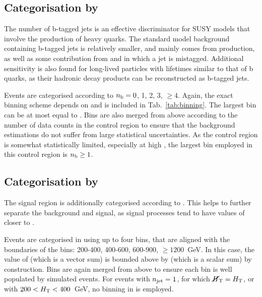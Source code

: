 \subsection*{Categorisation by \nb}

The number of b-tagged jets is an effective discriminator for SUSY %
models that involve the production of heavy quarks. The standard model 
background containing b-tagged jets is relatively smaller, and mainly comes 
from \ttbar production, as well as some contribution from \wj and \zj in which 
a jet is mistagged. Additional sensitivity is also found for long-lived 
particles with lifetimes similar to that of b quarks, as their hadronic decay 
products can be reconstructed as b-tagged jets.

Events are categorised according to $n_{\text{b}} = 0$, 1, 2, 3, $\geq4$.
Again, the exact binning scheme depends on \njet and is included in 
Tab.~\ref{tab:binning}.
The largest \nb bin can be at most equal to \njet. Bins are also merged from 
above according to the number of data counts in the \mj control region to 
ensure that the background estimations do not suffer from large statistical 
uncertainties.
As the \mmj control region is somewhat statistically limited, especially at 
high \nb, the largest \nb bin employed in this control region is $n_{\text{b}} \geq 1$.

\subsection*{Categorisation by \mht}

The signal region is additionally categorised according to \mht. This helps to 
further separate the background and signal, as signal processes 
tend to have values of \mht closer to \scalht.

Events are categorised in \mht using up to four bins, that are aligned with the 
boundaries of the \scalht bins: 200-400, 400-600, 600-900, $\geq1200$~GeV. In 
this case, the value of \mht (which is a vector sum) is bounded above by 
\scalht (which is a scalar sum) by construction. Bins 
are again merged from above 
to ensure each bin is well populated by simulated events. %
For events with $n_{\text{jet}}=1$, for which 
$\mbox{$\cancel{H}_\text{T}$}=\mbox{$H_\text{T}$}$, or with $200<\mbox{$H_\text{T}$}<400$~GeV, no binning in \mht is employed.

